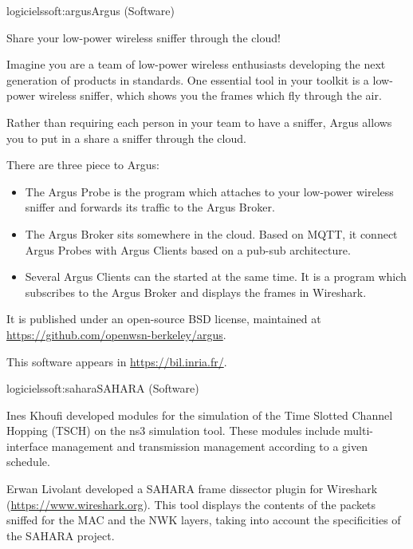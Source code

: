 \documentclass{ra2016}
\begin{document}
\begin{module}{logiciels}{soft:argus}{Argus (Software)}
\label{soft:argus}

\begin{participants}
\end{participants}

Share your low-power wireless sniffer through the cloud!

Imagine you are a team of low-power wireless enthusiasts developing the next generation of products in standards. One essential tool in your toolkit is a low-power wireless sniffer, which shows you the frames which fly through the air.

Rather than requiring each person in your team to have a sniffer, Argus allows you to put in a share a sniffer through the cloud.

There are three piece to Argus:

\begin{itemize}
    \item The Argus Probe is the program which attaches to your low-power wireless sniffer and forwards its traffic to the Argus Broker.
    \item The Argus Broker sits somewhere in the cloud. Based on MQTT, it connect Argus Probes with Argus Clients based on a pub-sub architecture.
    \item Several Argus Clients can the started at the same time. It is a program which subscribes to the Argus Broker and displays the frames in Wireshark.
\end{itemize}

It is published under an open-source BSD license, maintained at \url{https://github.com/openwsn-berkeley/argus}.

This software appears in \url{https://bil.inria.fr/}.

\end{module}

\begin{module}{logiciels}{soft:sahara}{SAHARA (Software)} 

\begin{participants}
\end{participants}

Ines Khoufi developed modules for the simulation of the Time Slotted Channel Hopping (TSCH) on the ns3 simulation tool.
These modules include multi-interface management and transmission management according to a given schedule. 
 
Erwan Livolant developed a SAHARA frame dissector plugin for Wireshark (\url{https://www.wireshark.org}).
This tool displays the contents of the packets sniffed for the MAC and the NWK layers, taking into account the specificities of the SAHARA project.

\end{module}
\end{document}
